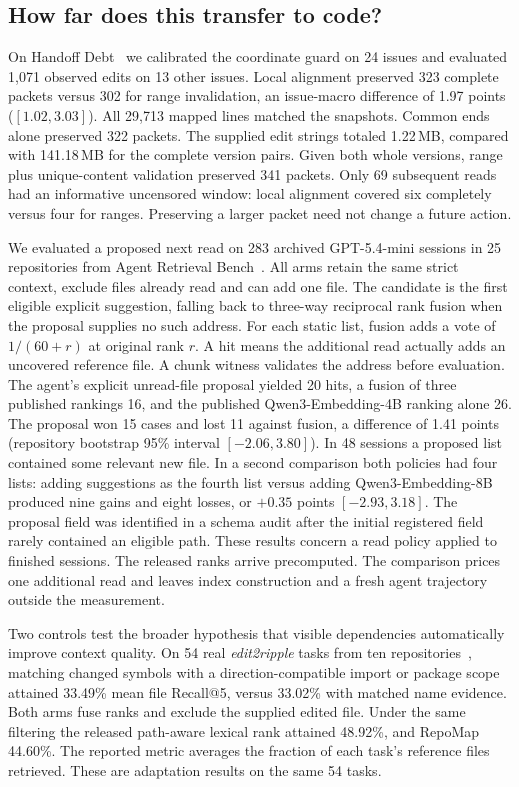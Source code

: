 \documentclass[conference]{IEEEtran}
\begin{document}
\subsection{How far does this transfer to code?}
On Handoff Debt~\cite{handoff} we calibrated the coordinate guard on 24 issues and evaluated 1,071 observed edits on 13 other issues. Local alignment preserved 323 complete packets versus 302 for range invalidation, an issue-macro difference of 1.97 points ($[1.02,3.03]$). All 29,713 mapped lines matched the snapshots. Common ends alone preserved 322 packets. The supplied edit strings totaled 1.22\,MB, compared with 141.18\,MB for the complete version pairs. Given both whole versions, range plus unique-content validation preserved 341 packets. Only 69 subsequent reads had an informative uncensored window: local alignment covered six completely versus four for ranges. Preserving a larger packet need not change a future action.

\balance
We evaluated a proposed next read on 283 archived GPT-5.4-mini sessions in 25 repositories from Agent Retrieval Bench~\cite{arb}. All arms retain the same strict context, exclude files already read and can add one file. The candidate is the first eligible explicit suggestion, falling back to three-way reciprocal rank fusion when the proposal supplies no such address. For each static list, fusion adds a vote of $1/(60+r)$ at original rank $r$. A hit means the additional read actually adds an uncovered reference file. A chunk witness validates the address before evaluation. The agent's explicit unread-file proposal yielded 20 hits, a fusion of three published rankings 16, and the published Qwen3-Embedding-4B ranking alone 26. The proposal won 15 cases and lost 11 against fusion, a difference of 1.41 points (repository bootstrap 95\% interval $[-2.06,3.80]$). In 48 sessions a proposed list contained some relevant new file. In a second comparison both policies had four lists: adding suggestions as the fourth list versus adding Qwen3-Embedding-8B produced nine gains and eight losses, or $+0.35$ points $[-2.93,3.18]$. The proposal field was identified in a schema audit after the initial registered field rarely contained an eligible path. These results concern a read policy applied to finished sessions. The released ranks arrive precomputed. The comparison prices one additional read and leaves index construction and a fresh agent trajectory outside the measurement.

Two controls test the broader hypothesis that visible dependencies automatically improve context quality. On 54 real \emph{edit2ripple} tasks from ten repositories~\cite{arb}, matching changed symbols with a direction-compatible import or package scope attained 33.49\% mean file Recall@5, versus 33.02\% with matched name evidence. Both arms fuse ranks and exclude the supplied edited file. Under the same filtering the released path-aware lexical rank attained 48.92\%, and RepoMap 44.60\%. The reported metric averages the fraction of each task's reference files retrieved. These are adaptation results on the same 54 tasks.
\end{document}
